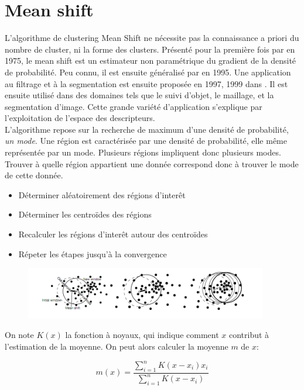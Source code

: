 \documentclass{article}
\begin{document}
\section{Mean shift}

L'algorithme de clustering Mean Shift ne nécessite pas la connaissance a
priori du nombre de cluster, ni la forme des clusters. Présenté pour la
première fois par \cite{fukugana} en 1975, le mean shift est un estimateur non
paramétrique du gradient de la densité de probabilité. Peu connu, il est
ensuite généralisé par \cite{cheng} en 1995. Une application au filtrage et à la
segmentation est ensuite proposée en 1997, 1999 dans \cite{comaniciu_meer}. Il est ensuite
utilisé dans des domaines tels que le suivi d'objet, le maillage, et la
segmentation d'image. Cette grande variété d'application s'explique par
l'exploitation de l'espace des descripteurs. \\
L'algorithme repose sur la recherche de maximum d'une densité de probabilité,
\textit{un mode}. Une région est caractérisée par une densité de probabilité,
elle même représentée par un mode. Plusieurs régions impliquent donc plusieurs
modes. Trouver à quelle région appartient une donnée correspond donc à trouver
le mode de cette donnée.

\begin{itemize}
\item Déterminer aléatoirement des régions d'interêt
\item Déterminer les centroïdes des régions
\item Recalculer les régions d'interêt autour des centroïdes
\item Répeter les étapes jusqu'à la convergence
\end{itemize}

\begin{figure}
\includegraphics[width=400px]{images/mean_shift_proc.png}
\end{figure}

On note $K(x)$ la fonction à noyaux, qui indique comment $x$ contribut à
l'estimation de la moyenne. On peut alors calculer la moyenne $m$ de $x$:

\begin{equation*}
m(x) = \frac{\sum_{i = 1}^n K (x - x_i) x_i}{\sum_{i = 1}^n K (x - x_i)}
\end{equation*}
\end{document}
